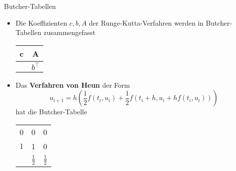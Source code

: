 \begin{frame}{Butcher-Tabellen}
    \begin{itemize}
        \item<1-> Die Koeffizienten $c,b,A$ der Runge-Kutta-Verfahren werden in Butcher-Tabellen zusammengefasst
        \begin{center}
            \begin{tabular}{c | c}
                c & A               \\
                \hline
                & $b^{\intercal}$
            \end{tabular}
        \end{center}
        \item Das \textbf{Verfahren von Heun} der Form
        \[
            u_{i+1}=h\left(\frac{1}{2}f(t_i,u_i)+\frac{1}{2}f(t_i+h,u_i+hf(t_i,u_i))\right)
        \]
        hat die Butcher-Tabelle
        \begin{center}
            \begin{tabular}{c | c c}
                0   & 0             & 0             \\
                $1$ & 1             & 0             \\
                \hline
                & $\frac{1}{2}$ & $\frac{1}{2}$
            \end{tabular}
        \end{center}
    \end{itemize}
\end{frame}


